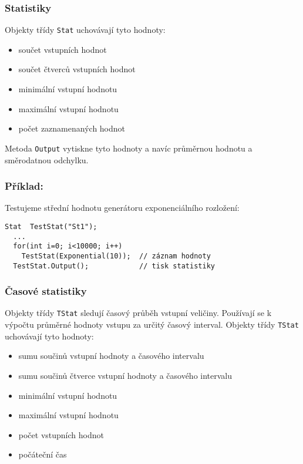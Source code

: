 \documentclass[a4paper]{article}
\begin{document}
\subsubsection{Statistiky}

Objekty třídy  \verb|Stat|  uchovávají tyto hodnoty:

\begin{itemize}
\item součet vstupních hodnot
\item součet čtverců vstupních hodnot
\item minimální vstupní hodnotu
\item maximální vstupní hodnotu
\item počet zaznamenaných hodnot
\end{itemize} 

Metoda \verb|Output| vytiskne tyto hodnoty a navíc průměrnou hodnotu
a směrodatnou odchylku.

\subsubsection*{Příklad:}

Testujeme střední hodnotu generátoru exponenciálního rozložení:

\begin{verbatim}
Stat  TestStat("St1");
  ...
  for(int i=0; i<10000; i++)
    TestStat(Exponential(10));  // záznam hodnoty
  TestStat.Output();            // tisk statistiky

\end{verbatim}

\subsubsection{Časové statistiky}

Objekty třídy \verb|TStat| sledují časový průběh vstupní veličiny.
Používají se k výpočtu průměrné hodnoty vstupu za určitý časový
interval. Objekty třídy \verb|TStat| uchovávají tyto hodnoty:

\begin{itemize}
\item sumu součinů vstupní hodnoty a časového intervalu
\item sumu součinů čtverce vstupní hodnoty a časového intervalu
\item minimální vstupní hodnotu
\item maximální vstupní hodnotu
\item počet vstupních hodnot
\item počáteční čas
\end{itemize}
\end{document}
